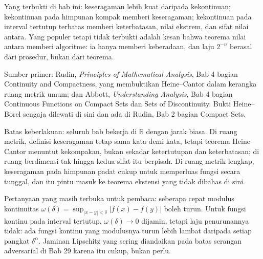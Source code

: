 \begin{untukpeneliti}
Yang terbukti di bab ini: keseragaman lebih kuat daripada kekontinuan; kekontinuan
pada himpunan kompak memberi keseragaman; kekontinuan pada interval tertutup terbatas
memberi keterbatasan, nilai ekstrem, dan sifat nilai antara. Yang populer tetapi tidak
terbukti adalah kesan bahwa teorema nilai antara memberi algoritme: ia hanya memberi
keberadaan, dan laju $2^{-n}$ berasal dari prosedur, bukan dari teorema.

Sumber primer: Rudin, \emph{Principles of Mathematical Analysis}, Bab 4 bagian
Continuity and Compactness, yang membuktikan Heine--Cantor dalam kerangka ruang metrik
umum; dan Abbott, \emph{Understanding Analysis}, Bab 4 bagian Continuous Functions on
Compact Sets dan Sets of Discontinuity. Bukti Heine--Borel sengaja dilewati di sini dan
ada di Rudin, Bab 2 bagian Compact Sets.

Batas keberlakuan: seluruh bab bekerja di $\mathbb{R}$ dengan jarak biasa. Di ruang
metrik, definisi keseragaman tetap sama kata demi kata, tetapi teorema Heine--Cantor
menuntut kekompakan, bukan sekadar ketertutupan dan keterbatasan; di ruang berdimensi
tak hingga kedua sifat itu berpisah. Di ruang metrik lengkap, keseragaman pada himpunan
padat cukup untuk memperluas fungsi secara tunggal, dan itu pintu masuk ke teorema
ekstensi yang tidak dibahas di sini.

Pertanyaan yang masih terbuka untuk pembaca: seberapa cepat modulus kontinuitas
$\omega(\delta)=\sup_{|x-y|<\delta}|f(x)-f(y)|$ boleh turun. Untuk fungsi kontinu
pada interval tertutup, $\omega(\delta)\to 0$ dijamin, tetapi laju penurunannya tidak:
ada fungsi kontinu yang modulusnya turun lebih lambat daripada setiap pangkat
$\delta^{\alpha}$. Jaminan Lipschitz yang sering diandaikan pada batas serangan
adversarial di Bab 29 karena itu cukup, bukan perlu.
\end{untukpeneliti}

